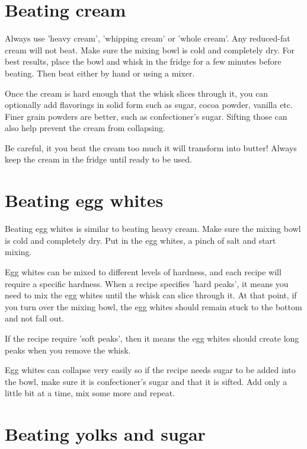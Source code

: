 \documentclass[10pt]{book}
\begin{document}
\newpage
\section*{Beating cream}

\indent\indent Always use 'heavy cream', 'whipping cream' or 'whole cream'. Any reduced-fat cream will not beat. Make sure the mixing bowl is cold and completely dry. For best results, place the bowl and whisk in the fridge for a few minutes before beating. Then beat either by hand or using a mixer. 

Once the cream is hard enough that the whisk slices through it, you can optionally add flavorings in solid form such as sugar, cocoa powder, vanilla etc. Finer grain powders are better, such as confectioner's sugar. Sifting those can also help prevent the cream from collapsing.

Be careful, it you beat the cream too much it will transform into butter! Always keep the cream in the fridge until ready to be used.

\newpage
\section*{Beating egg whites}

\indent\indent Beating egg whites is similar to beating heavy cream. Make sure the mixing bowl is cold and completely dry. Put in the egg whites, a pinch of salt and start mixing.

Egg whites can be mixed to different levels of hardness, and each recipe will require a specific hardness. When a recipe specifies 'hard peaks', it means you need to mix the egg whites until the whisk can slice through it. At that point, if you turn over the mixing bowl, the egg whites should remain stuck to the bottom and not fall out.

If the recipe require 'soft peaks', then it means the egg whites should create long peaks when you remove the whisk.

Egg whites can collapse very easily so if the recipe needs sugar to be added into the bowl, make sure it is confectioner's sugar and that it is sifted. Add only a little bit at a time, mix some more and repeat.

\newpage
\section*{Beating yolks and sugar}
\end{document}
